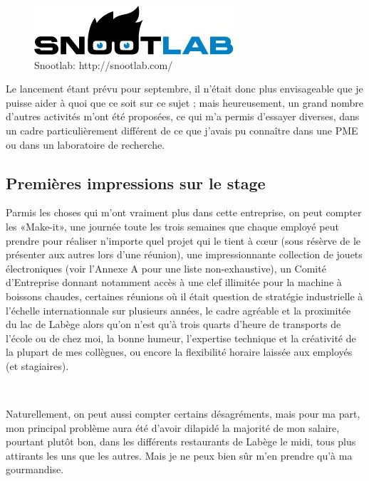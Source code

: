 \documentclass{article}
\begin{document}
\begin{figure}[h!]
    \centering\includegraphics[width=\linewidth/2]{img/snoot.jpg}
    \caption{Snootlab: http://snootlab.com/}
\end{figure}

Le lancement étant prévu pour septembre, il n’était donc plus envisageable que je puisse aider à quoi que ce soit sur ce sujet ; mais heureusement, un grand nombre d’autres activités m’ont été proposées, ce qui m’a permis d’essayer diverses, dans un cadre particulièrement différent de ce que j’avais pu connaître dans une PME ou dans un laboratoire de recherche.

\subsection{Premières impressions sur le stage}

Parmis les choses qui m’ont vraiment plus dans cette entreprise, on peut compter
les «Make-it», une journée toute les trois semaines que chaque employé peut prendre pour réaliser n’importe quel projet qui le tient à cœur (sous résèrve de le présenter aux autres lors d’une réunion),
une impressionnante collection de jouets électroniques (voir l’Annexe A pour une liste non-exhaustive),
un Comité d’Entreprise donnant notamment accès à une clef illimitée pour la machine à boissons chaudes,
certaines réunions où il était question de stratégie industrielle à l’échelle internationnale sur plusieurs années,
le cadre agréable et la proximitée du lac de Labège alors qu’on n’est qu’à trois quarts d’heure de transports de l’école ou de chez moi,
la bonne humeur, l’expertise technique et la créativité de la plupart de mes collègues,
ou encore la flexibilité horaire laissée aux employés (et stagiaires).

~

Naturellement, on peut aussi compter certains désagréments, mais pour ma part, mon principal problème aura été d’avoir dilapidé la majorité de mon salaire, pourtant plutôt bon, dans les différents restaurants de Labège le midi, tous plus attirants les uns que les autres. Mais je ne peux bien sûr m’en prendre qu’à ma gourmandise.
\end{document}
